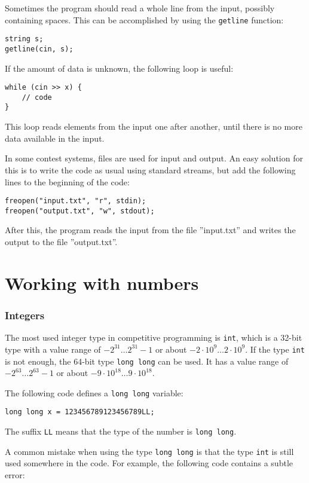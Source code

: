 Sometimes the program should read a whole line
from the input, possibly containing spaces.
This can be accomplished by using the
\texttt{getline} function:

\begin{lstlisting}
string s;
getline(cin, s);
\end{lstlisting}

If the amount of data is unknown, the following
loop is useful:
\begin{lstlisting}
while (cin >> x) {
    // code
}
\end{lstlisting}
This loop reads elements from the input
one after another, until there is no
more data available in the input.

In some contest systems, files are used for
input and output.
An easy solution for this is to write
the code as usual using standard streams,
but add the following lines to the beginning of the code:
\begin{lstlisting}
freopen("input.txt", "r", stdin);
freopen("output.txt", "w", stdout);
\end{lstlisting}
After this, the program reads the input from the file
''input.txt'' and writes the output to the file
''output.txt''.

\section{Working with numbers}


\subsubsection{Integers}

The most used integer type in competitive programming
is \texttt{int}, which is a 32-bit type with
a value range of $-2^{31} \ldots 2^{31}-1$
or about $-2 \cdot 10^9 \ldots 2 \cdot 10^9$.
If the type \texttt{int} is not enough,
the 64-bit type \texttt{long long} can be used.
It has a value range of $-2^{63} \ldots 2^{63}-1$
or about $-9 \cdot 10^{18} \ldots 9 \cdot 10^{18}$.

The following code defines a
\texttt{long long} variable:
\begin{lstlisting}
long long x = 123456789123456789LL;
\end{lstlisting}
The suffix \texttt{LL} means that the
type of the number is \texttt{long long}.

A common mistake when using the type \texttt{long long}
is that the type \texttt{int} is still used somewhere
in the code.
For example, the following code contains
a subtle error:

